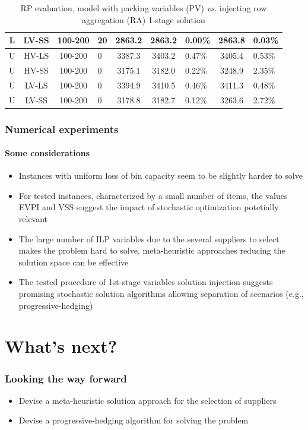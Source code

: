\documentclass[,9pt,xcolor={dvipsnames}]{beamer} %
\begin{document}
\begin{frame}
\begin{table}[h!]
\begin{tabular}{c c c f c c f c j}
			L & LV-SS & 100-200 & 20 & 2863.2 & 2863.2 & 0.00\% & 2863.8 & 0.03\% \\
			\hline
			U & HV-LS & 100-200 & 0 & 3387.3 & 3403.2 & 0.47\% & 3405.4 & 0.53\% \\
			U & HV-SS & 100-200 & 0 & 3175.1 & 3182.0 & 0.22\% & 3248.9 & 2.35\% \\
			U & LV-LS & 100-200 & 0 & 3394.9 & 3410.5 & 0.46\% & 3411.3 & 0.48\% \\
			U & LV-SS & 100-200 & 0 & 3178.8 & 3182.7 & 0.12\% & 3263.6 & 2.72\% \\
			\hline
		\end{tabular}
		\caption{RP evaluation, model with packing variables (PV) \textit{vs.} injecting row aggregation (RA) 1-stage solution}
		\label{tab:optres4}
	\end{table}
\end{frame}

\begin{frame}%
	\frametitle{Numerical experiments}
	\framesubtitle{Some considerations}	
	\begin{itemize}
		\item<1-> Instances with uniform loss of bin capacity seem to be slightly harder to solve
		\bigskip
		\item<2-> For tested instances, characterized by a small number of items, the values EVPI and VSS suggest the impact of stochastic optimization potetially relevant
		\bigskip
		\item<3-> The large number of ILP variables due to the several suppliers to select makes the problem hard to solve, meta-heuristic approaches reducing the solution space can be effective
		\bigskip
		\item<4-> The tested procedure of 1st-stage variables solution injection suggests promising stochastic solution algorithms allowing separation of scenarios (e.g., progressive-hedging)
	\end{itemize}
\end{frame}

\section {What's next?}
\begin{frame}%
	\frametitle{Looking the way forward}
	\begin{itemize}
		\item<1-> Devise a meta-heuristic solution approach for the selection of suppliers 
		\bigskip
		\item<2-> Devise a progressive-hedging algorithm for solving the problem
	\end{itemize}
\end{frame}
\end{document}
